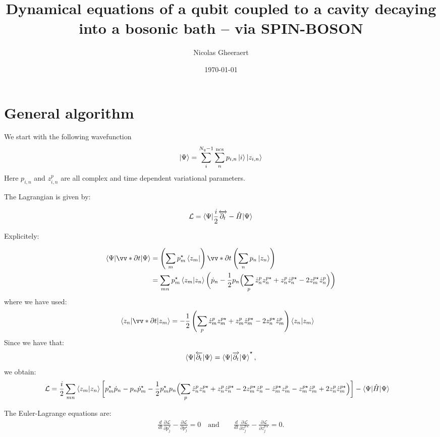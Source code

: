 \documentclass[prb]{revtex4}
\newcommand{\eq}[1]{\begin{align}#1\end{align}}
\newcommand{\Le}{\left}
\newcommand{\Ri}{\right}
\newcommand{\nn}{\nonumber}
\newcommand{\f}{\frac}
\newcommand{\mc}{\mathcal}
\newcommand{\ra}{\rangle}
\newcommand{\la}{\langle}
\newcommand*\conj[1]{{#1^\star}}
\newcommand*\conjp[1]{{#1^{p\star}}}
\begin{document}
\title{Dynamical equations of a qubit coupled to a cavity decaying into a bosonic bath -- via SPIN-BOSON}
\author{Nicolas Gheeraert}
\date{\today}
\maketitle


\section{General algorithm}


%
We start with the following wavefunction
\eq{
|\Psi\ra = \sum_{i}^{N_q-1} \sum_{n}^{\rm ncs} p_{i,n} \ket{i} \ket{z_{i,n}}
}
Here $p_{i,n}$ and $z_{i,n}^p$ are all complex and time dependent variational parameters. 

The Lagrangian is given by:

\eq{
\mc{L}  = \braket{ \Psi | \frac{i}{2}  \overleftrightarrow{\partial_t} - \hat H | \Psi  }
}

Explicitely:

\eq{
\braket{\Psi|  \vv*{\partial}{t} | \Psi } 
&=  \left(\sum_{m} p_m^\star  \bra{z_m} \right) \vv*{\partial}{t} \left(\sum_{n} p_n \ket{z_n} \right)  \notag \\
&= \sum_{mn} p_m^\star  \braket{z_m|z_n} \biggl( \dot{p}_n -\frac{1}{2}p_n \Bigl( \sum_p \dot{z}_n^p z_n^{p\star} + z_n^p \dot{z}_n^{p\star} - 2 z_m^{p\star} \dot{z}_n^p \Bigr)  \biggr)
}
where we have used: 
\eq{
\la z_n | \vv*{\partial}{t} | z_m \ra &= -\f{1}{2} \Le( \sum_p  \dot{z}_m^p z_m^{p\star} +
z_m^p \dot{z}_m^{p\star} -2 z_n^{p\star}\dot{z}_m^p \Ri) \la z_n | z_m \ra \nn 
}
Since we have that:
\eq{
\braket{\Psi|   \overleftarrow{\partial_t} | \Psi }  =  \braket{\Psi| \overrightarrow{\partial_t} | \Psi } ^\star,
}
we obtain:
\eq{
\mc{L}  &= \frac{i}{2}\sum_{mn}  \braket{z_m|z_n} \biggl[ p_m^\star \dot{p}_n - p_n \dot{p}_m^\star - \frac{1}{2}p_m^\star p_n \Bigl( \sum_p \dot{z}_n^p z_n^{p\star} + z_n^p \dot{z}_n^{p\star} - 2 z_m^{p\star} \dot{z}_n^p - \dot{z}_m^{p\star} z_m ^p- z_m^{p\star} \dot{z}_m^p + 2 z_n^p \dot{z}_m^{p\star} \Bigr)  \biggr] -  \braket{ \Psi |  \hat H | \Psi  }
}

The Euler-Lagrange equations are: 
\eq{
\f{d}{d t} \f{\partial \mc{L}}{\partial \conj{\dot{p}_j}} - \f{\partial
\mc{L}}{\partial \conj{p_j}} =0  \quad \text{and} \qquad
\f{d}{d t} \f{\partial
\mc{L}}{\partial \conjp{\dot{z}_j}} - \f{\partial
\mc{L}}{\partial \conjp{z_j}} =0.
}
\end{document}
